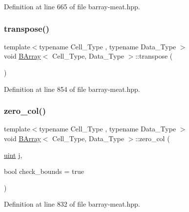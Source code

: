 Definition at line 665 of file barray-\/meat.\+hpp.

\mbox{\label{class_b_array_a0284f7f2148b7c1b474ebe01f6548b98}} 
\subsubsection{\texorpdfstring{transpose()}{transpose()}}
{\footnotesize\ttfamily template$<$typename Cell\+\_\+\+Type , typename Data\+\_\+\+Type $>$ \\
void \hyperlink{class_b_array}{B\+Array}$<$ Cell\+\_\+\+Type, Data\+\_\+\+Type $>$\+::transpose (\begin{DoxyParamCaption}{ }\end{DoxyParamCaption})\hspace{0.3cm}{\ttfamily [inline]}}



Definition at line 854 of file barray-\/meat.\+hpp.

\mbox{\label{class_b_array_a0fa473027d00ec53ed08eaea03ac3ef7}} 
\subsubsection{\texorpdfstring{zero\+\_\+col()}{zero\_col()}}
{\footnotesize\ttfamily template$<$typename Cell\+\_\+\+Type , typename Data\+\_\+\+Type $>$ \\
void \hyperlink{class_b_array}{B\+Array}$<$ Cell\+\_\+\+Type, Data\+\_\+\+Type $>$\+::zero\+\_\+col (\begin{DoxyParamCaption}\item[{\hyperlink{typedefs_8hpp_a91ad9478d81a7aaf2593e8d9c3d06a14}{uint}}]{j,  }\item[{bool}]{check\+\_\+bounds = {\ttfamily true} }\end{DoxyParamCaption})\hspace{0.3cm}{\ttfamily [inline]}}



Definition at line 832 of file barray-\/meat.\+hpp.

\mbox{\label{class_b_array_a411085fcb7530669c72d9847340f1bac}} 
